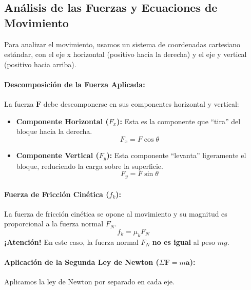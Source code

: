 \documentclass[11pt,a4paper]{book}
\begin{document}
\subsection*{Análisis de las Fuerzas y Ecuaciones de Movimiento}
Para analizar el movimiento, usamos un sistema de coordenadas cartesiano estándar, con el eje x horizontal (positivo hacia la derecha) y el eje y vertical (positivo hacia arriba).

\paragraph{Descomposición de la Fuerza Aplicada:}
La fuerza $\boldsymbol{F}$ debe descomponerse en sus componentes horizontal y vertical:
\begin{itemize}
    \item \textbf{Componente Horizontal ($F_x$):} Esta es la componente que ``tira'' del bloque hacia la derecha.
    \[ F_x = F \cos\theta \]
    \item \textbf{Componente Vertical ($F_y$):} Esta componente ``levanta'' ligeramente el bloque, reduciendo la carga sobre la superficie.
    \[ F_y = F \sin\theta \]
\end{itemize}

\paragraph{Fuerza de Fricción Cinética ($f_k$):}
La fuerza de fricción cinética se opone al movimiento y su magnitud es proporcional a la fuerza normal $F_N$.
\[ f_k = \mu_k F_N \]
\textbf{¡Atención!} En este caso, la fuerza normal $F_N$ \textbf{no es igual} al peso $mg$.

\paragraph{Aplicación de la Segunda Ley de Newton ($\Sigma \boldsymbol{F} = m\boldsymbol{a}$):}
Aplicamos la ley de Newton por separado en cada eje.
\end{document}
